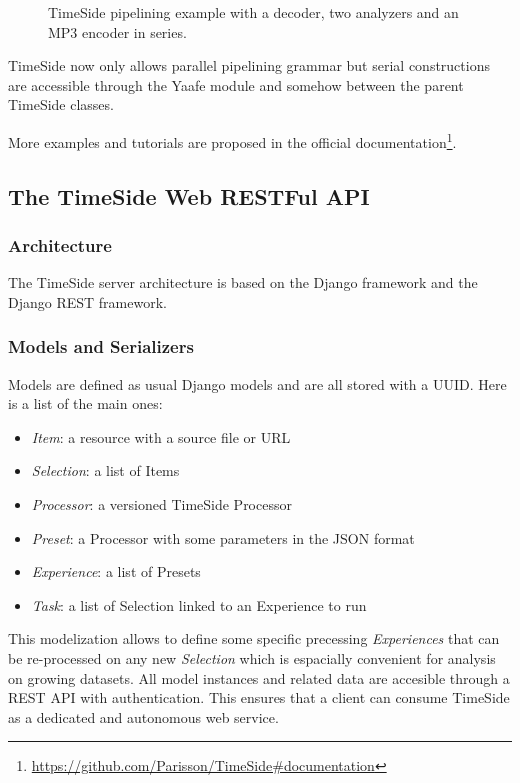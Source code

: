 \documentclass{article}
\begin{document}
\begin{figure}
 \centerline{}
 \caption{TimeSide pipelining example with a decoder, two analyzers and an MP3 encoder in series.}
 \label{fig:timeside_pipe}
\end{figure}

TimeSide now only allows parallel pipelining grammar but serial constructions are accessible through the Yaafe module and somehow between the parent TimeSide classes.

More examples and tutorials are proposed in the official documentation\footnote{\tiny\url{https://github.com/Parisson/TimeSide#documentation}}.

\subsection{The TimeSide Web RESTFul API}

\subsubsection{Architecture}

The TimeSide server architecture is based on the Django framework and the Django REST framework.

\subsubsection{Models and Serializers}

Models are defined as usual Django models and are all stored with a UUID. Here is a list of the main ones:

\begin{itemize}
 \item \textit{Item}: a resource with a source file or URL
 \item \textit{Selection}: a list of Items
 \item \textit{Processor}: a versioned TimeSide Processor
 \item \textit{Preset}: a Processor with some parameters in the JSON format
 \item \textit{Experience}: a list of Presets
 \item \textit{Task}: a list of Selection linked to an Experience to run
\end{itemize}

This modelization allows to define some specific precessing \textit{Experiences} that can be re-processed on any new \textit{Selection} which is espacially convenient for analysis on growing datasets. All model instances and related data are accesible through a REST API with authentication. This ensures that a client can consume TimeSide as a dedicated and autonomous web service.
\end{document}
